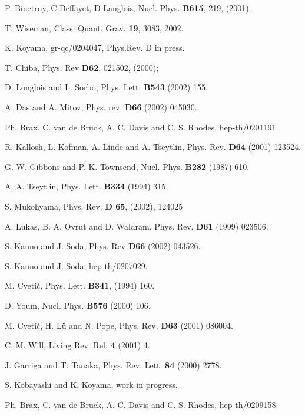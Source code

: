 \documentclass[a4paper,11pt]{article}
\begin{document}
\begin{thebibliography}{99}
P. Binetruy, C Deffayet, D Langlois,  Nucl. Phys. {\bf B615}, 219, (2001).

 T. Wiseman, 
Class. Quant. Grav. {\bf 19}, 3083, 2002.
 
 K. Koyama, 
gr-qc/0204047, Phys.Rev. D in press.

T. Chiba, 
Phys. Rev {\bf D62}, 021502, (2000);  

 D. Longlois and L. Sorbo, 
Phys. Lett. {\bf B543} (2002) 155. 

 A. Das and A. Mitov, 
Phys. rev. {\bf D66} (2002) 045030. 

 Ph. Brax, C. van de Bruck, A. C. Davis and 
C. S. Rhodes, hep-th/0201191. 

 R. Kallosh, L. Kofman, A. Linde and A. Tseytlin, 
Phys. Rev. {\bf D64} (2001) 123524. 

 G. W. Gibbons and P. K. Townsend, 
Nucl. Phys. {\bf B282} (1987) 610. 

 A. A. Tseytlin, Phys. Lett. {\bf B334} (1994) 315. 

 S. Mukohyama, Phys. Rev. {\bf D 65}, (2002), 124025 



 A. Lukas, B. A. Ovrut and D. Waldram, 
Phys. Rev. {\bf D61} (1999) 023506. 

 S. Kanno and J. Soda, 
Phys. Rev {\bf D66} (2002) 043526. 

 S. Kanno and J. Soda, hep-th/0207029.

 M. Cveti\v{c}, Phys. Lett. {\bf B341}, (1994) 160. 

 D. Youm, Nucl. Phys. {\bf B576} (2000) 106. 

 M. Cveti\v{c}, H. L\"{u} and N. Pope, Phys. Rev. {\bf D63} 
(2001) 086004. 


 C. M. Will, Living Rev. Rel. {\bf 4} (2001) 4.  

 J. Garriga and T. Tanaka, 
Phys. Rev. Lett. {\bf 84} (2000) 2778.  

 S. Kobayashi and K. Koyama, work in progress. 


 Ph. Brax, C. van de Bruck, A.-C. Davis and C. S. Rhodes, 
hep-th/0209158.


\end{thebibliography}


\end{document}
